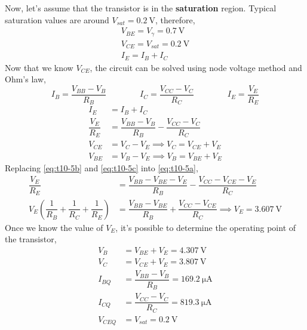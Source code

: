 \documentclass[10pt,a4paper]{memoir}
\begin{document}
\begin{solution}
  \bigskip
  \bigskip
  Now, let's assume that the transistor is in the \textbf{saturation} region. Typical saturation values are around $V_{sat} = \SI{0.2}{\volt}$, therefore,
  \begin{gather*}
    V_{BE} = V_{\gamma} =  \SI{0.7}{\volt}  \\
    V_{CE} = V_{sat} = \SI{0.2}{\volt}      \\
    I_{E}  = I_{B} + I_{C}
  \end{gather*}
  Now that we know $V_{CE}$, the circuit can be solved using node voltage method and Ohm's law,
  \begin{equation*}
    I_B = \dfrac{V_{BB} - V_B}{R_B}  \qquad\qquad I_C = \dfrac{V_{CC} - V_C}{R_C} \qquad\qquad I_E = \dfrac{V_E}{R_E}
  \end{equation*}
  \begin{align}
    I_E &= I_B + I_C \nonumber \\
    \dfrac{V_E}{R_E} &= \dfrac{V_{BB} - V_B}{R_B} - \dfrac{V_{CC} - V_C}{R_C} \label{eq:t10-5a} \\
    V_{CE} &= V_C - V_E \implies V_C = V_{CE} + V_E \label{eq:t10-5b} \\
    V_{BE} &= V_B - V_E \implies V_B = V_{BE} + V_E \label{eq:t10-5c} 
  \end{align}
  Replacing \eqref{eq:t10-5b} and \eqref{eq:t10-5c} into \eqref{eq:t10-5a},
  \begin{align*}
    \dfrac{V_E}{R_E} &= \dfrac{V_{BB} - V_{BE} - V_E}{R_B} - \dfrac{V_{CC} - V_{CE} - V_E}{R_C} \\
    V_E\left(\dfrac{1}{R_B} + \dfrac{1}{R_C} + \dfrac{1}{R_E}\right) &= \dfrac{V_{BB} - V_{BE}}{R_B} + \dfrac{V_{CC} - V_{CE}}{R_C} \implies V_E = \SI{3.607}{\volt}
  \end{align*}
  Once we know the value of $V_E$, it's possible to determine the operating point of the transistor,
  \begin{align*}
    V_B &= V_{BE} + V_E = \SI{4.307}{\volt} \\
    V_C &= V_{CE} + V_E = \SI{3.807}{\volt} \\
    I_{BQ} &= \dfrac{V_{BB} - V_B}{R_B} = \SI{169.2}{\micro\ampere} \\
    I_{CQ} &= \dfrac{V_{CC} - V_C}{R_C} = \SI{819.3}{\micro\ampere} \\
    V_{CEQ} &= V_{sat} = \SI{0.2}{\volt}
  \end{align*}
\end{solution}
\end{document}
